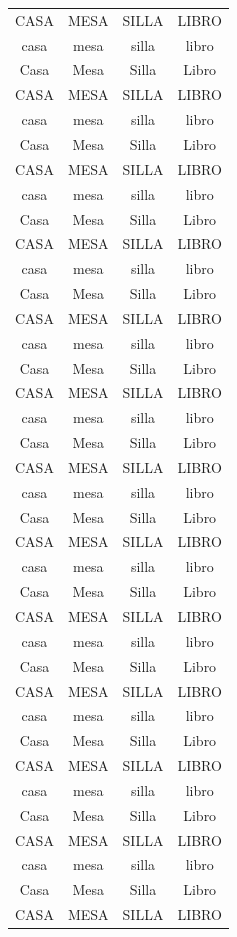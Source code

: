 \documentclass{report}
\begin{document}
\begin{longtable}[c]{c|c|c|c}
	CASA & MESA & SILLA & LIBRO \\
	casa & mesa & silla & libro \\
	Casa & Mesa & Silla & Libro \\
	CASA & MESA & SILLA & LIBRO \\
	casa & mesa & silla & libro \\
	Casa & Mesa & Silla & Libro \\
	CASA & MESA & SILLA & LIBRO \\
	casa & mesa & silla & libro \\
	Casa & Mesa & Silla & Libro \\
	CASA & MESA & SILLA & LIBRO \\
	casa & mesa & silla & libro \\
	Casa & Mesa & Silla & Libro \\
	CASA & MESA & SILLA & LIBRO \\
	casa & mesa & silla & libro \\
	Casa & Mesa & Silla & Libro \\
	CASA & MESA & SILLA & LIBRO \\
	casa & mesa & silla & libro \\
	Casa & Mesa & Silla & Libro \\
	CASA & MESA & SILLA & LIBRO \\
	casa & mesa & silla & libro \\
	Casa & Mesa & Silla & Libro \\
	CASA & MESA & SILLA & LIBRO \\
	casa & mesa & silla & libro \\
	Casa & Mesa & Silla & Libro \\
	CASA & MESA & SILLA & LIBRO \\
	casa & mesa & silla & libro \\
	Casa & Mesa & Silla & Libro \\
	CASA & MESA & SILLA & LIBRO \\
	casa & mesa & silla & libro \\
	Casa & Mesa & Silla & Libro \\
	CASA & MESA & SILLA & LIBRO \\
	casa & mesa & silla & libro \\
	Casa & Mesa & Silla & Libro \\
	CASA & MESA & SILLA & LIBRO \\
	casa & mesa & silla & libro \\
	Casa & Mesa & Silla & Libro \\
	CASA & MESA & SILLA & LIBRO \\

\end{longtable}
\end{document}
